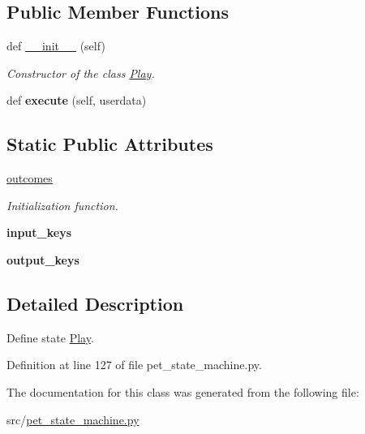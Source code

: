 \subsection*{Public Member Functions}
\begin{DoxyCompactItemize}
\item 
\mbox{\label{classpet__state__machine_1_1Play_adb3bdc9a1ce8b06943d53a9b73e0558b}} 
def \hyperlink{classpet__state__machine_1_1Play_adb3bdc9a1ce8b06943d53a9b73e0558b}{\+\_\+\+\_\+init\+\_\+\+\_\+} (self)
\begin{DoxyCompactList}\small\item\em Constructor of the class \hyperlink{classpet__state__machine_1_1Play}{Play}. \end{DoxyCompactList}\item 
\mbox{\label{classpet__state__machine_1_1Play_ad153d9a173ce8c4859965ba882821af3}} 
def {\bfseries execute} (self, userdata)
\end{DoxyCompactItemize}
\subsection*{Static Public Attributes}
\begin{DoxyCompactItemize}
\item 
\mbox{\label{classpet__state__machine_1_1Play_a64c512bcfb8c912d31aac4bb96f667aa}} 
\hyperlink{classpet__state__machine_1_1Play_a64c512bcfb8c912d31aac4bb96f667aa}{outcomes}
\begin{DoxyCompactList}\small\item\em Initialization function. \end{DoxyCompactList}\item 
\mbox{\label{classpet__state__machine_1_1Play_a8862ac2b55ef8d8e25f121793a98a0a7}} 
{\bfseries input\+\_\+keys}
\item 
\mbox{\label{classpet__state__machine_1_1Play_af3dd391502812c08315130f3e87594a3}} 
{\bfseries output\+\_\+keys}
\end{DoxyCompactItemize}


\subsection{Detailed Description}
Define state \hyperlink{classpet__state__machine_1_1Play}{Play}. 

Definition at line 127 of file pet\+\_\+state\+\_\+machine.\+py.



The documentation for this class was generated from the following file\+:\begin{DoxyCompactItemize}
\item 
src/\hyperlink{pet__state__machine_8py}{pet\+\_\+state\+\_\+machine.\+py}\end{DoxyCompactItemize}
